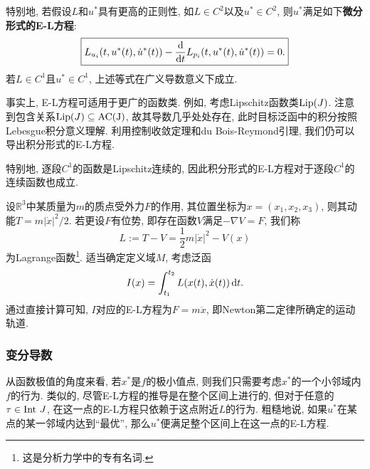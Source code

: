 特别地, 若假设$L$和$u^*$具有更高的正则性, 如$L \in C^2$以及$u^* \in C^2$, 则$u^*$满足如下\textbf{微分形式的E-L方程}:
\begin{equation*}
    \boxed{L_{u_i}(t, u^*(t), \dot{u}^*(t)) - \frac{{\rm d}}{{\rm d}t}L_{p_i}(t, u^*(t), \dot{u}^*(t)) = 0.}
\end{equation*}
若$L \in C^1$且$u^* \in C^1$, 上述等式在广义导数意义下成立.

\begin{remark}
    事实上, E-L方程可适用于更广的函数类. 例如, 考虑Lipschitz函数类${\rm Lip}(J)$.
    注意到包含关系${\rm Lip}(J) \subseteq {\rm AC(J)}$, 故其导数几乎处处存在, 此时目标泛函中的积分按照Lebesgue积分意义理解.
    利用控制收敛定理和du Bois-Reymond引理, 我们仍可以导出积分形式的E-L方程. 
    
    特别地, 逐段$C^1$的函数是Lipschitz连续的, 因此积分形式的E-L方程对于逐段$C^1$的连续函数也成立.
\end{remark}

\begin{example}[质点运动方程]
    设$\mathbb{R}^3$中某质量为$m$的质点受外力$F$的作用, 其位置坐标为$x = (x_1, x_2, x_3)$, 则其动能$T = m|\dot x|^2/2$.
    若更设$F$有位势, 即存在函数$V$满足$-\nabla V = F$, 我们称
    \begin{equation*}
        L := T - V = \frac{1}{2}m|\dot x|^2 - V(x)
    \end{equation*}  
    为Lagrange函数\footnote{这是分析力学中的专有名词.}. 适当确定定义域$M$, 考虑泛函
    \begin{equation*}
        I(x) = \int_{t_1}^{t_2} L(x(t), \dot x(t)) \,{\rm d}t.
    \end{equation*}
    通过直接计算可知, $I$对应的E-L方程为$F = m\ddot x$, 即Newton第二定律所确定的运动轨道.
\end{example}

\subsubsection{变分导数}

从函数极值的角度来看, 若$x^*$是$f$的极小值点, 则我们只需要考虑$x^*$的一个小邻域内$f$的行为.
类似的, 尽管E-L方程的推导是在整个区间上进行的, 但对于任意的$\tau \in {\rm Int}\ J$, 在这一点的E-L方程只依赖于这点附近$L$的行为.
粗糙地说, 如果$u^*$在某点的某一邻域内达到``最优'', 那么$u^*$便满足整个区间上在这一点的E-L方程.

